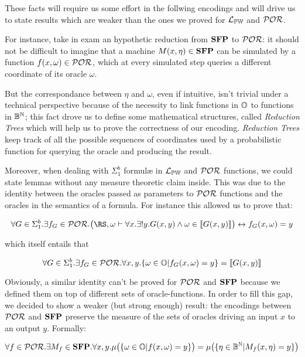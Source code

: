 \begin{conditional}{\notappendix}
  These facts will require us some effort in the follwing encodings and will drive us
  to state results which are weaker than the ones we proved for $\mathcal{L}_{\mathbb{PW}}$ and $\mathcal{POR}$.

  For instance, take in exam an hypothetic reduction from $\mathbf{SFP}$ to $\mathcal{POR}$:
  it should not be difficult to imagine that a machine $M(x, \eta) \in \mathbf{SFP}$ can
  be simulated by a function $f(x, \omega) \in \mathcal{POR}$, which at every simulated
  step queries a different coordinate of its oracle $\omega$.

  But the correspondance between $\eta$ and $\omega$, even if intuitive, isn't
  trivial under a technical perspective because of the necessity
  to link functions in $\mathbb{O}$ to functions in $\mathbb{B}^{\mathbb{N}}$; this fact
  drove us to define some mathematical structures, called \emph{Reduction Trees}
  which will help us to prove the correctness of our encoding. \emph{Reduction Trees}
  keep track of all the possible sequences of coordinates used by a probabilistic
  function for querying the oracle and producing the result.


  Moreover, when dealing with $\Sigma^b_1$ formul\ae{} in $\mathcal{L}_{\mathbb{PW}}$
  and $\mathcal{POR}$ functions, we could state lemmas without any measure
  theoretic claim inside. This was due to the identity between the oracles
  passed as parameters to $\mathcal{POR}$ functions and the oracles in the semantics
  of a formula. For instance this allowed us to prove that:

  \[
  \forall G \in \Sigma^b_1. \exists f_G \in \POR. \big(\RS, \omega \vdash \forall x. \exists ! y. G(x, y) \land \omega \in \llbracket G(x, y) \rrbracket\big)  \leftrightarrow f_G(x, \omega) = y
  \]

  which itself entails that

  \[
  \forall G\in \Sigma^b_1. \exists f_G \in \mathcal{POR}.
  \forall x, y. \{\omega \in \mathbb{O} | f_G(x, \omega)=y\} = \llbracket G(x, y)\rrbracket
  \]

  Obviously, a similar identity can't be proved for $\mathcal{POR}$ and $\mathbf{SFP}$ because
  we defined them on top of different sets of oracle-functions.
  In order to fill this gap, we decided to show a weaker (but strong enough) result:
  the encodings between $\mathcal{POR}$ and $\mathbf{SFP}$ preserve the measure of the
  sets of oracles driving an input $x$ to an output $y$. Formally:

  \[
  \forall f\in \mathcal{POR}. \exists M_f \in \mathbf{SFP}.
  \forall x, y.\mu\big( \{\omega \in \mathbb{O} | f(x, \omega)=y\} \big)=
  \mu \big(\{\eta \in \mathbb{B}^{\mathbb{N}} | M_f(x, \eta)=y\}\big)
  \]


\end{conditional}
